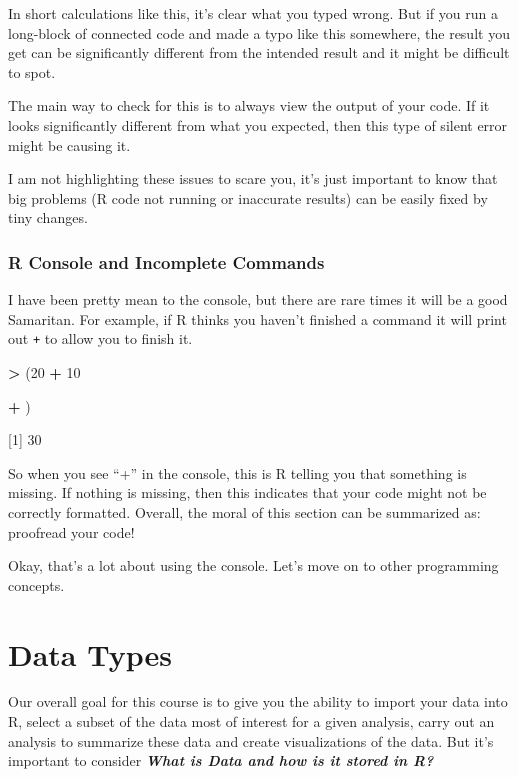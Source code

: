 \documentclass[
]{book}
\newenvironment{Shaded}{\begin{snugshade}}{\end{snugshade}}
\newcommand{\DecValTok}[1]{\textcolor[rgb]{0.00,0.00,0.81}{#1}}
\newcommand{\NormalTok}[1]{#1}
\newcommand{\SpecialCharTok}[1]{\textcolor[rgb]{0.81,0.36,0.00}{\textbf{#1}}}
\begin{document}
In short calculations like this, it's clear what you typed wrong. But if you run a long-block of connected code and made a typo like this somewhere, the result you get can be significantly different from the intended result and it might be difficult to spot.

The main way to check for this is to always view the output of your code. If it looks significantly different from what you expected, then this type of silent error might be causing it.

I am not highlighting these issues to scare you, it's just important to know that big problems (R code not running or inaccurate results) can be easily fixed by tiny changes.

\hypertarget{r-console-and-incomplete-commands}{%
\subsubsection{R Console and Incomplete Commands}\label{r-console-and-incomplete-commands}}

I have been pretty mean to the console, but there are rare times it will be a good Samaritan. For example, if R thinks you haven't finished a command it will print out \texttt{+} to allow you to finish it.

\begin{Shaded}
\begin{Highlighting}[]
\SpecialCharTok{\textgreater{}}\NormalTok{ (}\DecValTok{20} \SpecialCharTok{+} \DecValTok{10}
 
\SpecialCharTok{+}\NormalTok{ )}

\NormalTok{[}\DecValTok{1}\NormalTok{] }\DecValTok{30}
\end{Highlighting}
\end{Shaded}

So when you see ``+'' in the console, this is R telling you that something is missing. If nothing is missing, then this indicates that your code might not be correctly formatted. Overall, the moral of this section can be summarized as: proofread your code!

Okay, that's a lot about using the console. Let's move on to other programming concepts.

\hypertarget{data-types}{%
\section{Data Types}\label{data-types}}

Our overall goal for this course is to give you the ability to import your data into R, select a subset of the data most of interest for a given analysis, carry out an analysis to summarize these data and create visualizations of the data. But it's important to consider \textbf{\emph{What is Data and how is it stored in R?}}
\end{document}
